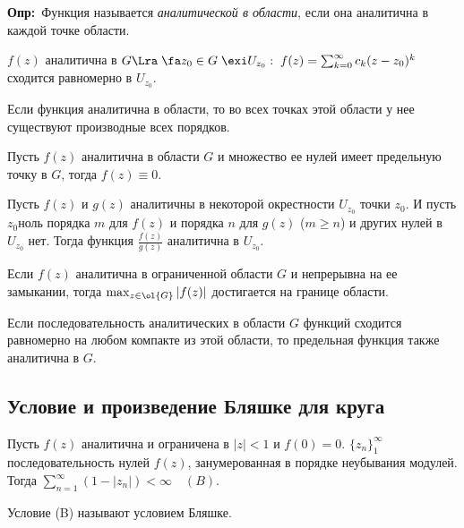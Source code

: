 \documentclass[a4paper]{article}
\def\defin{\noindent\textbf{Опр:}\ }
\begin{document}
\defin Функция называется \emph{аналитической в
области}, если она аналитична в каждой точке области.

\begin{theorems}
$f(z)$ аналитична в $G\Lra\;\fa z_0\in G\;\exi
U_{z_0}:\;f(z)=\sum_{k=0}^{\infty}c_k(z-z_0)^k$ сходится
равномерно в $U_{z_0}.$
\end{theorems}


\begin{theorems}
Если функция аналитична в области, то во всех точках этой области
у нее существуют производные всех порядков.
\end{theorems}

\begin{theorems}[Единственности]
Пусть $f(z)$ аналитична в области $G$ и множество ее нулей имеет
предельную точку в $G$, тогда $f(z)\equiv0.$
\end{theorems}

\begin{theorems}
Пусть $f(z)$ и $g(z)$ аналитичны в некоторой окрестности $U_{z_0}$
точки $z_0$. И пусть $z_0$\т ноль порядка $m$ для $f(z)$ и порядка
$n$ для $g(z)$ ($m\ge n$) и других нулей в $U_{z_0}$ нет. Тогда
функция $\frac {f(z)}{g(z)}$ аналитична в $U_{z_0}$.
\end{theorems}

\begin{theorems}
Если $f(z)$ аналитична в ограниченной области $G$ и непрерывна на
ее замыкании, тогда $\max_{z\in \ol{G}}|f(z)|$ достигается
на границе области.
\end{theorems}

\begin{theorems}[Вейерштрасс]
Если последовательность аналитических в области $G$ функций
сходится равномерно на любом компакте из этой области, то
предельная функция также аналитична в $G.$
\end{theorems}

\subsection{Условие и произведение Бляшке для круга}
\begin{theorems}
Пусть $f(z)$ аналитична и ограничена в $|z|<1$ и $f(0)=0$.
$\{z_n\}_1^{\infty}$\т последовательность нулей $f(z)$,
занумерованная в порядке неубывания модулей. Тогда
$\sum_{n=1}^{\infty}(1-|z_n|)<\infty\quad(B).$
\end{theorems}
Условие (B) называют условием Бляшке.
\end{document}
